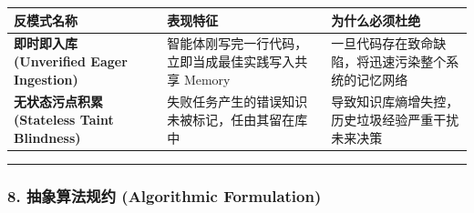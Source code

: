 {\def\LTcaptype{} %
\begin{longtable}[]{@{}
  >{\raggedright\arraybackslash}p{}
  >{\raggedright\arraybackslash}p{}
  >{\raggedright\arraybackslash}p{}@{}}
\toprule\noalign{}
\begin{minipage}[b]{\linewidth}\raggedright
反模式名称
\end{minipage} & \begin{minipage}[b]{\linewidth}\raggedright
表现特征
\end{minipage} & \begin{minipage}[b]{\linewidth}\raggedright
为什么必须杜绝
\end{minipage} \\
\midrule\noalign{}
\endhead
\bottomrule\noalign{}
\endlastfoot
\textbf{即时即入库 (Unverified Eager Ingestion)} &
智能体刚写完一行代码，立即当成最佳实践写入共享 Memory &
一旦代码存在致命缺陷，将迅速污染整个系统的记忆网络 \\
\textbf{无状态污点积累 (Stateless Taint Blindness)} &
失败任务产生的错误知识未被标记，任由其留在库中 &
导致知识库熵增失控，历史垃圾经验严重干扰未来决策 \\
\end{longtable}
}

\begin{center}\rule{0.5\linewidth}{0.5pt}\end{center}

\subsubsection{8. 抽象算法规约 (Algorithmic
Formulation)}\label{ux62bdux8c61ux7b97ux6cd5ux89c4ux7ea6-algorithmic-formulation-12}

